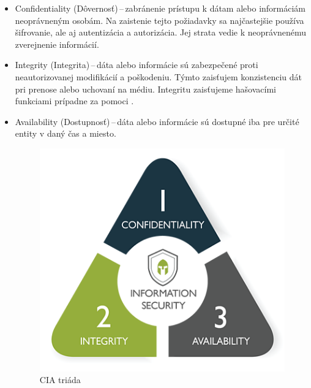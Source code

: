 \begin{itemize}
	\item Confidentiality (Dôvernosť)\,--\,zabránenie prístupu k dátam alebo informáciám neoprávneným osobám. Na zaistenie tejto požiadavky sa najčastejšie používa šifrovanie, ale aj autentizácia a autorizácia. Jej strata vedie k neoprávnenému zverejnenie informácií. \cite{McMillan2018}
	
	\item Integrity (Integrita)\,--\,dáta alebo informácie sú zabezpečené proti neautorizovanej modifikácií a poškodeniu. Týmto zaisťujem konzistenciu dát pri prenose alebo uchovaní na médiu. Integritu zaisťujeme hašovacími funkciami prípadne za pomoci . \cite{McMillan2018}
	
	\item Availability (Dostupnosť)\,--\,dáta alebo informácie sú dostupné iba pre určité entity v daný čas a miesto. \cite{McMillan2018}

	\begin{figure}[!h]
		\begin{center}
			\includegraphics[scale=0.3]{obrazky/cia.png}
		\end{center}
		\caption[Triáda CIA]{CIA triáda\footnotemark}				\label{cia}
	\end{figure}
\end{itemize}

